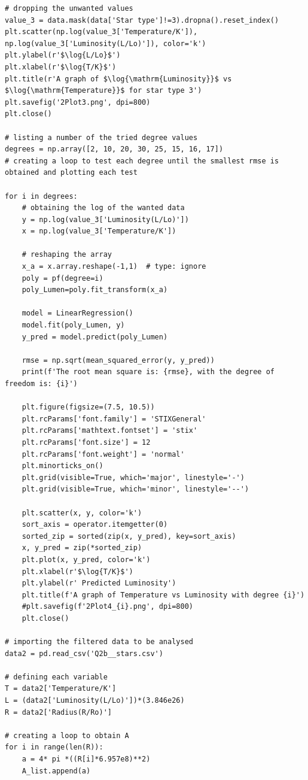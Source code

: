 \documentclass[12pt, a4paper]{article}
\begin{document}
\begin{verbatim}
# dropping the unwanted values
value_3 = data.mask(data['Star type']!=3).dropna().reset_index()
plt.scatter(np.log(value_3['Temperature/K']), np.log(value_3['Luminosity(L/Lo)']), color='k')
plt.ylabel(r'$\log{L/Lo}$')
plt.xlabel(r'$\log{T/K}$')
plt.title(r'A graph of $\log{\mathrm{Luminosity}}$ vs $\log{\mathrm{Temperature}}$ for star type 3')
plt.savefig('2Plot3.png', dpi=800)
plt.close()

# listing a number of the tried degree values
degrees = np.array([2, 10, 20, 30, 25, 15, 16, 17])
# creating a loop to test each degree until the smallest rmse is obtained and plotting each test

for i in degrees:
    # obtaining the log of the wanted data
    y = np.log(value_3['Luminosity(L/Lo)'])
    x = np.log(value_3['Temperature/K'])

    # reshaping the array
    x_a = x.array.reshape(-1,1)  # type: ignore
    poly = pf(degree=i)
    poly_Lumen=poly.fit_transform(x_a)

    model = LinearRegression()
    model.fit(poly_Lumen, y)
    y_pred = model.predict(poly_Lumen)

    rmse = np.sqrt(mean_squared_error(y, y_pred))
    print(f'The root mean square is: {rmse}, with the degree of freedom is: {i}')

    plt.figure(figsize=(7.5, 10.5))
    plt.rcParams['font.family'] = 'STIXGeneral'
    plt.rcParams['mathtext.fontset'] = 'stix'
    plt.rcParams['font.size'] = 12
    plt.rcParams['font.weight'] = 'normal'
    plt.minorticks_on()
    plt.grid(visible=True, which='major', linestyle='-')
    plt.grid(visible=True, which='minor', linestyle='--')

    plt.scatter(x, y, color='k')
    sort_axis = operator.itemgetter(0)
    sorted_zip = sorted(zip(x, y_pred), key=sort_axis)
    x, y_pred = zip(*sorted_zip)
    plt.plot(x, y_pred, color='k')
    plt.xlabel(r'$\log{T/K}$')
    plt.ylabel(r' Predicted Luminosity')
    plt.title(f'A graph of Temperature vs Luminosity with degree {i}')
    #plt.savefig(f'2Plot4_{i}.png', dpi=800)
    plt.close()

# importing the filtered data to be analysed
data2 = pd.read_csv('Q2b__stars.csv')

# defining each variable
T = data2['Temperature/K']
L = (data2['Luminosity(L/Lo)'])*(3.846e26)
R = data2['Radius(R/Ro)']

# creating a loop to obtain A
for i in range(len(R)):
    a = 4* pi *((R[i]*6.957e8)**2)
    A_list.append(a)


\end{verbatim}
\end{document}
